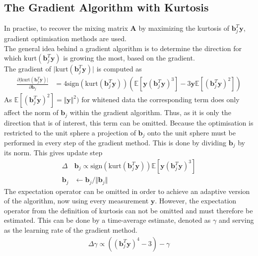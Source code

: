\subsection{The Gradient Algorithm with Kurtosis}\label{sec:gra_kur}
In practise, to recover the mixing matrix $\textbf{A}$ by maximizing the kurtosis of $\textbf{b}_{j}^T \textbf{y}$, gradient optimisation methods are used.\\
The general idea behind a gradient algorithm is to determine the direction for which $\text{kurt}(\textbf{b}_{j}^T \textbf{y})$ is growing the most, based on the gradient. \\

The gradient of $\vert \text{kurt}(\textbf{b}_{j}^T \textbf{y}) \vert$ is computed as
\begin{align}\label{eq:kurt}
\frac{\partial \vert \text{kurt}(\textbf{b}_{j}^T \textbf{y})\vert}{\partial \mathbf{b}_j} &= 4 \text{sign}(\text{kurt}(\textbf{b}_{j}^T \textbf{y})) (\mathbb{E}[\mathbf{y} (\textbf{b}_{j}^T \textbf{y})^3] - 3 \mathbf{y} \mathbb{E}[(\textbf{b}_{j}^T \textbf{y})^2]) 
\end{align} 
As $\mathbb{E}[(\textbf{b}_{j}^T \textbf{y})^2] =\Vert \mathbf{y} \Vert^2)$ for whitened data the corresponding term does only affect the norm of $\textbf{b}_j$ within the gradient algorithm. Thus, as it is only the direction that is of interest, this term can be omitted. Because the optimisation is restricted to the unit sphere a projection of $\textbf{b}_j$ onto the unit sphere must be performed in every step of the gradient method. This is done by dividing $\textbf{b}_j$ by its norm. This gives update step 
\begin{align*}
\Delta &\textbf{b}_j \propto \text{sign}\left( \text{kurt}(\textbf{b}_{j}^T \textbf{y}) \right) \mathbb{E}[\textbf{y}(\textbf{b}_{j}^T \textbf{y})^3] \\
\textbf{b}_j &\leftarrow \textbf{b}_j/\Vert \textbf{b}_j \Vert
\end{align*}  
The expectation operator can be omitted in order to achieve an adaptive version of the algorithm, now using every measurement $\textbf{y}$. However, the expectation operator from the definition of kurtosis can not be omitted and must therefore be estimated. This can be done by a time-average estimate, denoted as $\gamma$ and serving as the learning rate of the gradient method.
\begin{align*}
\Delta \gamma \propto((\textbf{b}_{j}^T \textbf{y})^4 - 3) - \gamma
\end{align*}

